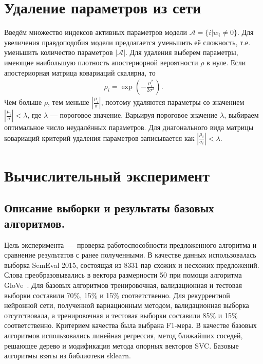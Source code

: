 \documentclass[12pt, fleqn, unicode]{article}
\begin{document}





\newpage
\section{Удаление параметров из сети}

Введём множество индексов активных параметров модели $\mathcal{A} = \{i | w_i \neq 0\} $. Для увеличения правдоподобия модели предлагается уменьшить её сложность, т.е. уменьшить количество параметров $|\mathcal{A}|$. Для удаления выберем параметры, имеющие наибольшую плотность апостериорной вероятности $\rho$ в нуле.
Если апостериорная матрица ковариаций скалярна, то  
\begin{gather}
	\rho_i = \exp\left(-\frac{\mu_i^2}{2\sigma^2}\right).
\end{gather}
Чем больше $\rho$, тем меньше $|\frac{\mu_i}{\sigma}|$, поэтому удаляются параметры со значением $|\frac{\mu_i}{\sigma}| < \lambda$, где $\lambda$ --- пороговое значение. Варьируя пороговое значение $\lambda$, выбираем оптимальное число неудалённых параметров.
Для диагонального вида матрицы ковариаций критерий удаления параметров записывается как $|\frac{\mu_i}{\sigma_i}| < \lambda$.



\newpage
\section{Вычислительный эксперимент}
\subsection{Описание выборки и результаты базовых алгоритмов.}
Цель эксперимента~--- проверка работоспособности предложенного алгоритма и сравнение результатов с ранее полученными. В качестве данных использовалась выборка SemEval 2015, состоящая из 8331 пар схожих и несхожих предложений. Слова преобразовывались в вектора размерности 50 при помощи алгоритма GloVe~\cite{GloveURL}.
Для базовых алгоритмов тренировочная, валидационная и тестовая выборки составили 70\%, 15\% и 15\% соответственно.
Для рекуррентной нейронной сети, полученной вариационным методом, валидационная выборка отсутствовала, а тренировочная и тестовая выборки составили 85\% и 15\% соответственно.
Критерием качества была выбрана F1-мера.
В качестве базовых алгоритмов использовались линейная регрессия, метод ближайших соседей, решающее дерево и модификация метода опорных векторов SVC. Базовые алгоритмы взяты из библиотеки sklearn.
\end{document}
